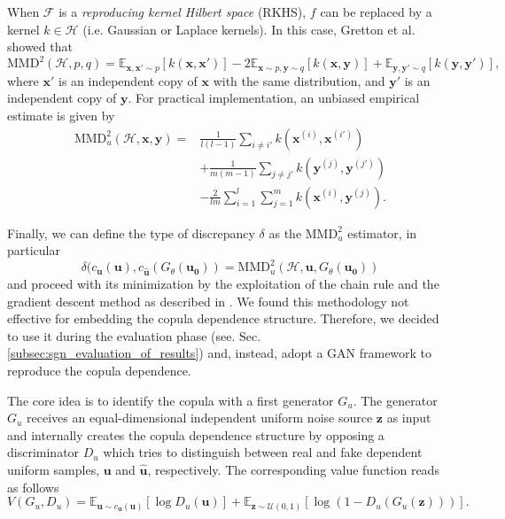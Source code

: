 When $\mathcal{F}$ is a \textit{reproducing kernel Hilbert space} (RKHS), $f$ can be replaced by a kernel $k\in \mathcal{H}$ (i.e. Gaussian or Laplace kernels). In this case, Gretton et al. \cite{Gretton2012} showed that 
\begin{equation}
\text{MMD}^2(\mathcal{H},p,q) = \mathbb{E}_{\mathbf{x,x'}\sim p}[k(\mathbf{x,x'})]-2\mathbb{E}_{\mathbf{x}\sim p,\mathbf{y}\sim q}[k(\mathbf{x,y})]  +\mathbb{E}_{\mathbf{y,y'}\sim q}[k(\mathbf{y,y'})],
\label{eq:sgn_MMDK}
\end{equation}
where $\mathbf{x'}$ is an independent copy of $\mathbf{x}$ with the same distribution, and $\mathbf{y'}$ is an independent copy of $\mathbf{y}$.
For practical implementation, an unbiased empirical estimate is given by
\begin{align}
\text{MMD}_u^2(\mathcal{H},\mathbf{x},\mathbf{y}) = & \frac{1}{l(l-1)}\sum_{i\neq i'}{k(\mathbf{x}^{(i)},\mathbf{x}^{(i')})} \nonumber \\ 
& + \frac{1}{m(m-1)}\sum_{j\neq j'}{k(\mathbf{y}^{(j)},\mathbf{y}^{(j')})} \nonumber \\ 
& - \frac{2}{lm}\sum_{i=1}^{l}{\sum_{j=1}^{m}{k(\mathbf{x}^{(i)},\mathbf{y}^{(j)})}}.
\label{eq:sgn_MMDKe}
\end{align}

Finally, we can define the type of discrepancy $\delta$ as the $\text{MMD}_u^2$ estimator, in particular
\begin{equation}
\delta(c_{\mathbf{u}}(\mathbf{u}), c_{\mathbf{\hat{u}}}(G_{\theta}(\mathbf{u_0})) = \text{MMD}_u^2(\mathcal{H},\mathbf{u},G_{\theta}(\mathbf{u_0}))
\label{eq:sgn_DeltaMMD}
\end{equation}
and proceed with its minimization by the exploitation of the chain rule and the gradient descent method as described in \cite{MMDnets}. We found this methodology not effective for embedding the copula dependence structure. Therefore, we decided to use it during the evaluation phase (see. Sec. \ref{subsec:sgn_evaluation_of_results}) and, instead, adopt a GAN framework to reproduce the copula dependence.  


The core idea is to identify the copula with a first generator $G_u$. The generator $G_u$ receives an equal-dimensional independent uniform noise source $\mathbf{z}$ as input and internally creates the copula dependence structure by opposing a discriminator $D_u$ which tries to distinguish between real and fake dependent uniform samples, $\mathbf{u}$ and $\mathbf{\hat{u}}$, respectively. 
The corresponding value function reads as follows
\begin{equation}
V(G_u,D_u) =  \mathbb{E}_{\mathbf{u} \sim c_{\mathbf{u}}(\mathbf{u})}[\log D_u(\mathbf{u})]  + \mathbb{E}_{\mathbf{z} \sim \mathcal{U}(0,1)}[\log(1-D_u(G_u(\mathbf{z})))].
\label{eq:sgn_V1}
\end{equation}

